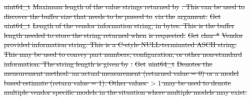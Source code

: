 \documentclass[12pt]{report} %
\providecommand{\DIFdeltex}[1]{{\protect\color{red}\sout{#1}}}                      %
\providecommand{\DIFdel}[1]{\texorpdfstring{\DIFdeltex{#1}}{}} %
\begin{document}
\DIFdel{uint64_t   }%
\DIFdel{Maximum length of the value strings returned by }%
\DIFdel{. This can be used to discover the buffer size that needs to be passed to }%
\DIFdel{via the }%
\DIFdel{argument. }%
\DIFdel{Get     }%
\DIFdel{uint64_t   }%
\DIFdel{Length of the vendor information string, in bytes. This is the buffer length needed to store the string returned when }%
\DIFdel{is requested. }%
\DIFdel{Get     }%
\DIFdel{char *     }%
\DIFdel{Vendor provided information string. This is a C-style NULL-terminated ASCII string. This may be used to convey part numbers, configuration, or other non-standard information. The string length is given by }%
\DIFdel{. }%
\DIFdel{Get     }%
\DIFdel{uint64_t   }%
\DIFdel{Denotes the measurement method: an actual measurement (returned value = 0) or a model based estimate (return value = 1). Other values $> 1$ may be used to denote multiple vendor specific models in the situation where multiple models may exist. }%

\end{document}
